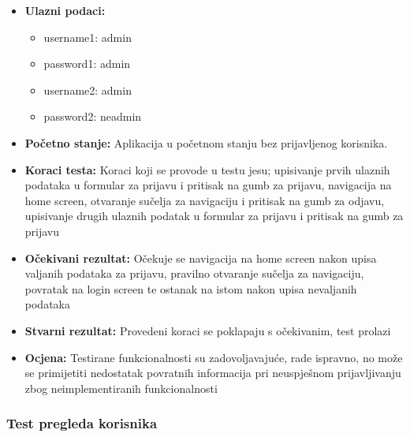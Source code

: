 			 \begin{itemize}
			 	
			 \item{\textbf{Ulazni podaci:}}
			 \begin{itemize}
			 	\item{username1: admin}
			 	\item{password1: admin}
			 	\item{username2: admin}
			 	\item{password2: neadmin}
			 \end{itemize}
			 
			 \item{\textbf{Početno stanje:} Aplikacija u početnom stanju bez prijavljenog korisnika.}
			 
			 \item{\textbf{Koraci testa:} Koraci koji se provode u testu jesu; upisivanje prvih ulaznih podataka u formular za prijavu i pritisak na gumb za prijavu, navigacija na home screen, otvaranje sučelja za navigaciju i pritisak na gumb za odjavu, upisivanje drugih ulaznih podatak u formular za prijavu i pritisak na gumb za prijavu}
			 
			 \item{\textbf{Očekivani rezultat:} Očekuje se navigacija na home screen nakon upisa valjanih podataka za prijavu, pravilno otvaranje sučelja za navigaciju, povratak na login screen te ostanak na istom nakon upisa nevaljanih podataka}
			 
			 \item{\textbf{Stvarni rezultat:} Provedeni koraci se poklapaju s očekivanim, test prolazi}
			 
			 \item{\textbf{Ocjena:} Testirane funkcionalnosti su zadovoljavajuće, rade ispravno, no može se primijetiti nedostatak povratnih informacija pri neuspješnom prijavljivanju zbog neimplementiranih funkcionalnosti}
			 
			\end{itemize}
			
			\subsubsection{Test pregleda korisnika}
			
